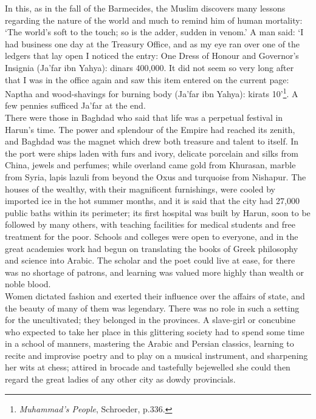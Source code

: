 \documentclass[10pt, twoside]{book}
\begin{document}
In this, as in the fall of the Barmecides, the Muslim discovers many lessons regarding the nature of 
the world and much to remind him of human mortality: `The world's soft to the touch; so is the adder, 
sudden in venom.' A man said: `I had business one day at the Treasury Office, and as my eye ran over 
one of the ledgers that lay open I noticed the entry: One Dress of Honour and Governor's Insignia 
(Ja'far ibn Yahya): dinars 400,000. It did not seem so very long after that I was in the office again 
and saw this item entered on the current page: Naptha and wood\hyp{}shavings for burning body (Ja'far ibn 
Yahya): kirats 10'\footnote{\emph{Muhammad's People}, Schroeder, p.336.}. A few pennies sufficed Ja'far at the end. \\

There were those in Baghdad who said that life was a perpetual festival in Harun's time. The power 
and splendour of the Empire had reached its zenith, and Baghdad was the magnet which drew both 
treasure and talent to itself. In the port were ships laden with furs and ivory, delicate porcelain 
and silks from China, jewels and perfumes; while overland came gold from Khurasan, marble from Syria, 
lapis lazuli from beyond the Oxus and turquoise from Nishapur. The houses of the wealthy, with their 
magnificent furnishings, were cooled by imported ice in the hot summer months, and it is said that 
the city had 27,000 public baths within its perimeter; its first hospital was built by Harun, soon to 
be followed by many others, with teaching facilities for medical students and free treatment for the 
poor. Schools and colleges were open to everyone, and in the great academies work had begun on 
translating the books of Greek philosophy and science into Arabic. The scholar and the poet could 
live at ease, for there was no shortage of patrons, and learning was valued more highly than wealth 
or noble blood. \\

Women dictated fashion and exerted their influence over the affairs of state, and the beauty of many 
of them was legendary. There was no role in such a setting for the uncultivated; they belonged in the 
provinces. A slave\hyp{}girl or concubine who expected to take her place in this glittering society had to 
spend some time in a school of manners, mastering the Arabic and Persian classics, learning to recite 
and improvise poetry and to play on a musical instrument, and sharpening her wits at chess; attired 
in brocade and tastefully bejewelled she could then regard the great ladies of any other city as 
dowdy provincials. \\
\end{document}
